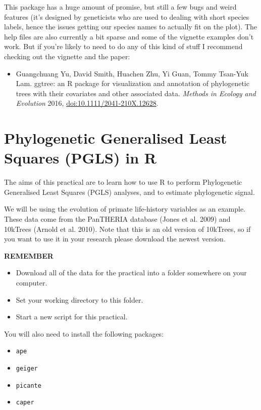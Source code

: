 \documentclass[]{book}
\providecommand{\tightlist}{%
  \setlength{\itemsep}{0pt}\setlength{\parskip}{0pt}}
\theoremstyle{definition}
\theoremstyle{definition}
\theoremstyle{definition}
\theoremstyle{remark}
\begin{document}
This package has a huge amount of promise, but still a few bugs and
weird features (it's designed by geneticists who are used to dealing
with short species labels, hence the issues getting our species names to
actually fit on the plot). The help files are also currently a bit
sparse and some of the vignette examples don't work. But if you're
likely to need to do any of this kind of stuff I recommend checking out
the vignette and the paper:

\begin{itemize}
\tightlist
\item
  Guangchuang Yu, David Smith, Huachen Zhu, Yi Guan, Tommy Tsan-Yuk Lam.
  ggtree: an R package for visualization and annotation of phylogenetic
  trees with their covariates and other associated data. \emph{Methods
  in Ecology and Evolution} 2016, \url{doi:10.1111/2041-210X.12628}.
\end{itemize}

\chapter{Phylogenetic Generalised Least Squares (PGLS) in
R}\label{phylogenetic-generalised-least-squares-pgls-in-r}

The aims of this practical are to learn how to use R to perform
Phylogenetic Generalised Least Squares (PGLS) analyses, and to estimate
phylogenetic signal.

We will be using the evolution of primate life-history variables as an
example. These data come from the PanTHERIA database (Jones et al. 2009)
and 10kTrees (Arnold et al. 2010). Note that this is an old version of
10kTrees, so if you want to use it in your research please download the
newest version.

\textbf{REMEMBER}

\begin{itemize}
\tightlist
\item
  Download all of the data for the practical into a folder somewhere on
  your computer.
\item
  Set your working directory to this folder.
\item
  Start a new script for this practical.
\end{itemize}

You will also need to install the following packages:

\begin{itemize}
\tightlist
\item
  \texttt{ape}
\item
  \texttt{geiger}
\item
  \texttt{picante}
\item
  \texttt{caper}
\end{itemize}
\end{document}

